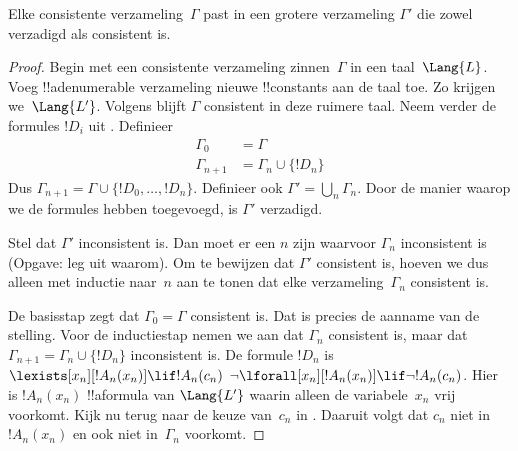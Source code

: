 \documentclass[../../../include/open-logic-section]{subfiles}
\begin{document}
\begin{lem}
Elke consistente verzameling~$\Gamma$ past in een grotere verzameling
$\Gamma'$ die zowel verzadigd als consistent is.
\end{lem}

\begin{proof}
Begin met een consistente verzameling zinnen~$\Gamma$ in een
taal~$\Lang{L}$. Voeg !!a{denumerable} verzameling nieuwe !!{constant}s
aan de taal toe. Zo krijgen we~$\Lang{L'}$. Volgens
 blijft $\Gamma$ consistent in deze ruimere taal.
Neem verder de formules $!D_i$ uit . Definieer
\begin{align*}
\Gamma_0 & = \Gamma \\
\Gamma_{n+1} & = \Gamma_n \cup \{!D_n \}
\end{align*}
Dus $\Gamma_{n+1} = \Gamma \cup \{ !D_0, \dots, !D_n \}$. Definieer
ook $\Gamma' = \bigcup_{n} \Gamma_n$. Door de manier waarop we de
formules hebben toegevoegd, is $\Gamma'$ verzadigd.

Stel dat $\Gamma'$ inconsistent is. Dan moet er een $n$ zijn waarvoor
$\Gamma_n$ inconsistent is (Opgave: leg uit waarom). Om te bewijzen dat
$\Gamma'$ consistent is, hoeven we dus alleen met inductie naar~$n$ aan
te tonen dat elke verzameling~$\Gamma_n$ consistent is.

De basisstap zegt dat $\Gamma_0 = \Gamma$ consistent is. Dat is precies
de aanname van de stelling. Voor de inductiestap nemen we aan dat
$\Gamma_{n}$ consistent is, maar dat $\Gamma_{n+1} =
\Gamma_n \cup \{!D_n\}$ inconsistent is. De formule $!D_n$ is
{$\lexists[x_{n}][!A_{n}(x_n)] \lif !A_{n}(c_{n})$}
{$\lnot\lforall[x_{n}][!A_{n}(x_n)] \lif \lnot !A_{n}(c_{n})$}.
Hier is $!A_n(x_n)$ !!a{formula} van $\Lang{L'}$ waarin alleen de
variabele~$x_n$ vrij voorkomt. Kijk nu terug naar de keuze van~$c_n$ in
. Daaruit volgt dat $c_n$ niet in~$!A_n(x_n)$ en
ook niet in~$\Gamma_n$ voorkomt.


\end{proof}
\end{document}
